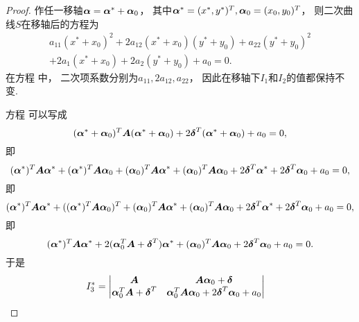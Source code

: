 \begin{theorem}
\begin{proof}
作任一移轴\(\boldsymbol\alpha = \boldsymbol\alpha^* + \boldsymbol\alpha_0\)，
其中\(
	\boldsymbol\alpha^* = (x^*,y^*)^T,
	\boldsymbol\alpha_0 = (x_0,y_0)^T
\)，
则二次曲线\(S\)在移轴后的方程为\begin{equation}\label{equation:二次曲线方程的不变量.移轴后的方程}
	\begin{array}{r}
		a_{11} (x^* + x_0)^2
		+ 2 a_{12} (x^* + x_0) (y^* + y_0)
		+ a_{22} (y^* + y_0)^2 \\
		+ 2 a_1 (x^* + x_0)
		+ 2 a_2 (y^* + y_0)
		+ a_0
		= 0.
	\end{array}
\end{equation}
在方程  中，
二次项系数分别为\(a_{11},2 a_{12},a_{22}\)，
因此在移轴下\(I_1\)和\(I_2\)的值都保持不变.

方程  可以写成\begin{equation*}
	(\boldsymbol\alpha^* + \boldsymbol\alpha_0)^T
	\boldsymbol{A}
	(\boldsymbol\alpha^* + \boldsymbol\alpha_0)
	+ 2 \boldsymbol\delta^T
	(\boldsymbol\alpha^* + \boldsymbol\alpha_0)
	+ a_0
	= 0,
\end{equation*}
即\begin{equation*}
	(\boldsymbol\alpha^*)^T
	\boldsymbol{A}
	\boldsymbol\alpha^*
	+ (\boldsymbol\alpha^*)^T
	\boldsymbol{A}
	\boldsymbol\alpha_0
	+ (\boldsymbol\alpha_0)^T
	\boldsymbol{A}
	\boldsymbol\alpha^*
	+ (\boldsymbol\alpha_0)^T
	\boldsymbol{A}
	\boldsymbol\alpha_0
	+ 2 \boldsymbol\delta^T \boldsymbol\alpha^*
	+ 2 \boldsymbol\delta^T \boldsymbol\alpha_0
	+ a_0
	= 0,
\end{equation*}
即\begin{equation*}
	(\boldsymbol\alpha^*)^T
	\boldsymbol{A}
	\boldsymbol\alpha^*
	+ (
		(\boldsymbol\alpha^*)^T
		\boldsymbol{A}
		\boldsymbol\alpha_0
	)^T
	+ (\boldsymbol\alpha_0)^T
	\boldsymbol{A}
	\boldsymbol\alpha^*
	+ (\boldsymbol\alpha_0)^T
	\boldsymbol{A}
	\boldsymbol\alpha_0
	+ 2 \boldsymbol\delta^T \boldsymbol\alpha^*
	+ 2 \boldsymbol\delta^T \boldsymbol\alpha_0
	+ a_0
	= 0,
\end{equation*}
即\begin{equation*}
	(\boldsymbol\alpha^*)^T
	\boldsymbol{A}
	\boldsymbol\alpha^*
	+ 2 (\boldsymbol\alpha_0^T \boldsymbol{A} + \boldsymbol\delta^T) \boldsymbol\alpha^*
	+ (\boldsymbol\alpha_0)^T
	\boldsymbol{A}
	\boldsymbol\alpha_0
	+ 2 \boldsymbol\delta^T \boldsymbol\alpha_0
	+ a_0
	= 0.
\end{equation*}
于是\begin{align*}
	I_3^*
	&= \begin{vmatrix}
		\boldsymbol{A} & \boldsymbol{A} \boldsymbol\alpha_0 + \boldsymbol\delta \\
		\boldsymbol\alpha_0^T \boldsymbol{A} + \boldsymbol\delta^T & \boldsymbol\alpha_0^T \boldsymbol{A} \boldsymbol\alpha_0 + 2 \boldsymbol\delta^T \boldsymbol\alpha_0 + a_0

\end{vmatrix}
\end{align*}
\end{proof}
\end{theorem}
